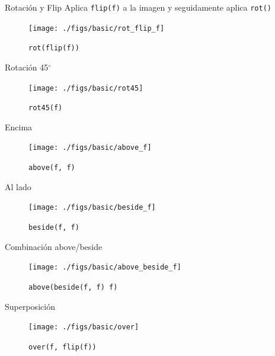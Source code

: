 \documentclass{beamer}
\begin{document}
    \begin{frame}{Rotación y Flip}
        Aplica \texttt{flip(f)} a la imagen y seguidamente aplica \texttt{rot()}

        \begin{figure}
            \centering
            \texttt{[image: ./figs/basic/rot\_flip\_f]}
            \caption{\texttt{rot(flip(f))}}
            \label{fig:rot_flip_f}
        \end{figure}
    \end{frame}

    \begin{frame}{Rotación 45$^{\circ}$}
        \begin{figure}
            \centering
            \texttt{[image: ./figs/basic/rot45]}
            \caption{\texttt{rot45(f)}}
            \label{fig:rot45}
        \end{figure}
    \end{frame}

    \begin{frame}{Encima}
        \begin{figure}
            \centering
            \texttt{[image: ./figs/basic/above\_f]}
            \caption{\texttt{above(f, f)}}
            \label{fig:above}
        \end{figure}
    \end{frame}

    \begin{frame}{Al lado}
        \begin{figure}
            \centering
            \texttt{[image: ./figs/basic/beside\_f]}
            \caption{\texttt{beside(f, f)}}
            \label{fig:beside}
        \end{figure}
    \end{frame}

    \begin{frame}{Combinación above/beside}
        \begin{figure}
            \centering
            \texttt{[image: ./figs/basic/above\_beside\_f]}
            \caption{\texttt{above(beside(f, f) f)}}
            \label{fig:above_beside_f}
        \end{figure}
    \end{frame}

    \begin{frame}{Superposición}
        \begin{figure}
            \centering
            \texttt{[image: ./figs/basic/over]}
            \caption{\texttt{over(f, flip(f))}}
            \label{fig:over_f}
        \end{figure}
    \end{frame}
\end{document}
